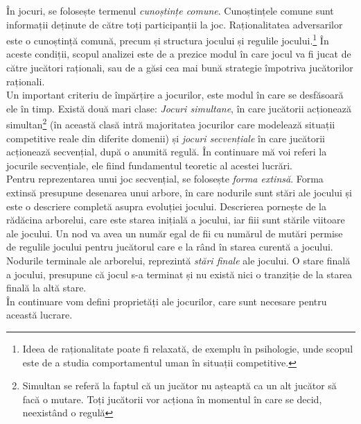 \documentclass[12pt,twoside,a4paper,fleqn]{book}
\theoremstyle{definition}
\begin{document}
 În jocuri, se folosește termenul \emph{cunoștințe comune}\cite{turocy}. Cunoștințele comune sunt informații deținute de către toți participanții la joc. Raționalitatea adversarilor este o cunoștință comună, precum și structura jocului și regulile jocului.\footnote{Ideea de raționalitate poate fi relaxată, de exemplu în psihologie, unde scopul este de a studia comportamentul uman în situații competitive.} În aceste condiții, scopul analizei este de a prezice modul în care jocul va fi jucat de către jucători raționali, sau de a găsi cea mai bună strategie împotriva jucătorilor raționali.\\
Un important criteriu de împărțire a jocurilor, este modul în care se desfăsoară ele în timp. Există două mari clase: \emph{Jocuri simultane}, în care jucătorii acționează simultan\footnote{Simultan se referă la faptul că un jucător nu așteaptă ca un alt jucător să facă o mutare. Toți jucătorii vor acționa în momentul în care se decid, neexistând o regulă} (în această clasă intră majoritatea jocurilor care modelează situații competitive reale din diferite domenii) și \emph{jocuri secvențiale} în care jucătorii acționează secvențial, după o anumită regulă. În continuare mă voi referi la jocurile secvențiale, ele fiind fundamentul teoretic al acestei lucrări.\\
Pentru reprezentarea unui joc secvențial, se folosește \emph{forma extinsă}. Forma extinsă presupune desenarea unui arbore, în care nodurile sunt stări ale jocului și este o descriere completă asupra evoluției jocului. Descrierea pornește de la rădăcina arborelui, care este starea inițială a jocului, iar fiii sunt stările viitoare ale jocului. Un nod va avea un număr egal de fii cu numărul de mutări permise de regulile jocului pentru jucătorul care e la rând în starea curentă a jocului. Nodurile terminale ale arborelui, reprezintă \emph{stări finale} ale jocului. O stare finală a jocului, presupune că jocul s-a terminat și nu există nici o tranziție de la starea finală la altă stare. \cite{Shoham}\\
În continuare vom defini proprietăți ale jocurilor, care sunt necesare pentru această lucrare.
\end{document}
